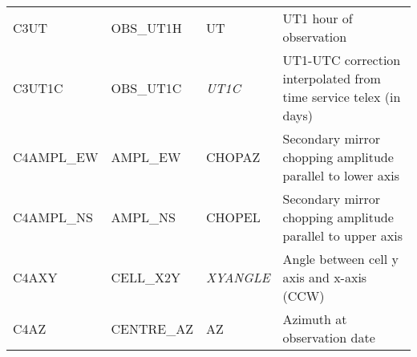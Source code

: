\begin{sidewaystable*}
\begin{center}
\begin{tabular}{llll}
C3UT & OBS\_UT1H & UT & UT1 hour of observation\\
C3UT1C & OBS\_UT1C & \emph{UT1C} & UT1-UTC correction interpolated from time service telex (in days)\\
C4AMPL\_EW & AMPL\_EW & CHOPAZ & Secondary mirror chopping amplitude parallel to lower axis\\
C4AMPL\_NS & AMPL\_NS & CHOPEL & Secondary mirror chopping amplitude parallel to upper axis\\
C4AXY & CELL\_X2Y & \emph{XYANGLE} & Angle between cell y axis and x-axis (CCW)\\
C4AZ & CENTRE\_AZ & AZ & Azimuth at observation date\\

\hline
\end{tabular}
\end{center}
\end{sidewaystable*}


